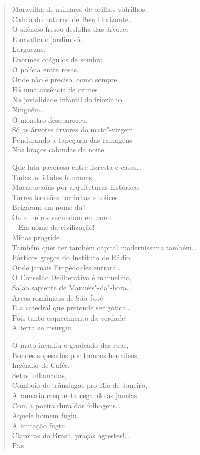 \begin{verse}
Maravilha de milhares de brilhos vidrilhos,\\
Calma do noturno de Belo Horizonte\ldots{}\\
O silêncio fresco desfolha das árvores\\
E orvalha o jardim só.\\
Larguezas.\\
Enormes coágulos de sombra.\\
O polícia entre rosas\ldots{}\\
\qquad{}Onde não é preciso, como sempre\ldots{}\\
Há uma ausência de crimes\\
Na jovialidade infantil do friozinho.\\
Ninguém.\\
O monstro desapareceu.\\
Só as árvores árvores do mato"-virgem\\
Pendurando a tapeçaria das ramagens\\
Nos braços cabindas da noite.

Que luta pavorosa entre floresta e casas\ldots{}\\
Todas as idades humanas\\
Macaqueadas por arquiteturas históricas\\
Torres torreões torrinhas e tolices\\
Brigaram em nome da?\\
Os mineiros secundam em coro:\\
-- Em nome da civilização!\\
Minas progride.\\
Também quer ter também capital moderníssima também\ldots{}\\
Pórticos gregos do Instituto de Rádio\\
Onde jamais Empédocles entrará\ldots{}\\
O Conselho Deliberativo é manuelino,\\
Salão sapiente de Manuéis"-da"-hora\ldots{}\\
Arcos românicos de São José\\
E a catedral que pretende ser gótica\ldots{}\\
Pois tanto esquecimento da verdade!\\
A terra se insurgiu.

O mato invadiu o gradeado das ruas,\\
Bondes sopesados por troncos hercúleos,\\
Incêndio de Cafés,\\
Setas inflamadas,\\
Comboio de trânsfugas pro Rio de Janeiro,\\
A ramaria crequenta cegando as janelas\\
Com a poeira dura das folhagens\ldots{}\\
Aquele homem fugiu.\\
A imitação fugiu.\\
Clareiras do Brasil, praças agrestes!\ldots{}\\
Paz.


\end{verse}
